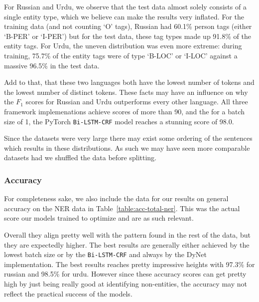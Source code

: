 For Russian and Urdu, we observe that the test data almost solely consists of a
single entity type, which we believe can make the results very inflated. For the
training data (and not counting `O' tags), Russian had 60.1\% person tags
(either `B-PER' or `I-PER') but for the test data, these tag types made up
91.8\% of the entity tags. For Urdu, the uneven distribution was even more
extreme: during training, 75.7\% of the entity tags were of type `B-LOC' or
`I-LOC' against a massive 96.5\% in the test data.

Add to that, that these two languages both have the lowest number of tokens and
the lowest number of distinct tokens. These facts may have an influence on why
the $F_{1}$ scores for Russian and Urdu outperforms every other language.
All three framework implemenations achieve scores of more than 90, and the for
a batch size of 1, the PyTorch \texttt{Bi-LSTM-CRF} model reaches a stunning
score of 98.0.

Since the datasets were very large there may exist some ordering of the
sentences which results in these distributions. As such we may have seen more
comparable datasets had we shuffled the data before splitting.

\subsubsection*{Accuracy}

For completeness sake, we also include the data for our results on general
accuracy on the NER data in Table~\ref{table:acc-total-ner}. This was the actual
score our models trained to optimize and are as such relevant. 

Overall they align pretty well with the pattern found in the rest of the data,
but they are expectedly higher. The best results are generally either achieved
by the lowest batch size or by the \texttt{Bi-LSTM-CRF} and always by the DyNet
implementation. The best results reaches pretty impressive heights with
97.3\% for russian and 98.5\% for urdu. However since these accuracy scores can
get pretty high by just being really good at identifying non-entities, the
accuracy may not reflect the practical success of the models.

